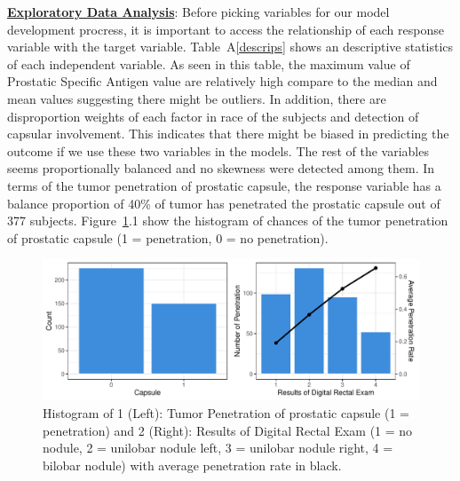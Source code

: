 \documentclass[11pt]{article}\usepackage[]{graphicx}\usepackage[]{color}
\makeatletter
\def\maxwidth{ %
  \ifdim\Gin@nat@width>\linewidth
    \linewidth
  \else
    \Gin@nat@width
  \fi
}
\makeatother
\begin{document}
\noindent\textbf{\underline{Exploratory Data Analysis}}: Before picking variables for our model development procress, it is important to access the relationship of each response variable with the target variable. Table~A\ref{descrips} shows an descriptive statistics of each independent variable. As seen in this table, the maximum value of Prostatic Specific Antigen value are relatively high compare to the median and mean values suggesting there might be outliers. In addition, there are disproportion weights of each factor in race of the subjects and detection of capsular involvement. This indicates that there might be biased in predicting the outcome if we use these two variables in the models. The rest of the variables seems proportionally balanced and no skewness were detected among them. In terms of the tumor penetration of prostatic capsule, the response variable has a balance proportion of 40\% of tumor has penetrated the prostatic capsule out of 377 subjects. Figure~\ref{explore1}.1 show the histogram of chances of the tumor penetration of prostatic capsule (1 = penetration, 0 = no penetration).  

\begin{figure}[h!] 
\begin{center}

\includegraphics[width=\maxwidth]{figure/unnamed-chunk-1-1} 

\caption{Histogram of 1 (Left): Tumor Penetration of prostatic capsule (1 = penetration) and 2 (Right): Results of Digital Rectal Exam (1 = no nodule, 2 = unilobar nodule left, 3 = unilobar nodule right, 4 = bilobar nodule) with average penetration rate in black.}
\label{explore1}
\end{center} 
\end{figure}
\end{document}

